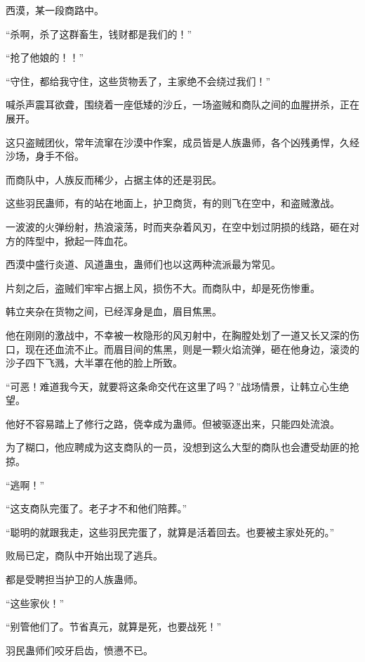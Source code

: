 
\begin{this_body}

西漠，某一段商路中。

“杀啊，杀了这群畜生，钱财都是我们的！”

“抢了他娘的！！”

“守住，都给我守住，这些货物丢了，主家绝不会绕过我们！”

喊杀声震耳欲聋，围绕着一座低矮的沙丘，一场盗贼和商队之间的血腥拼杀，正在展开。

这只盗贼团伙，常年流窜在沙漠中作案，成员皆是人族蛊师，各个凶残勇悍，久经沙场，身手不俗。

而商队中，人族反而稀少，占据主体的还是羽民。

这些羽民蛊师，有的站在地面上，护卫商货，有的则飞在空中，和盗贼激战。

一波波的火弹纷射，热浪滚荡，时而夹杂着风刃，在空中划过阴损的线路，砸在对方的阵型中，掀起一阵血花。

西漠中盛行炎道、风道蛊虫，蛊师们也以这两种流派最为常见。

片刻之后，盗贼们牢牢占据上风，损伤不大。而商队中，却是死伤惨重。

韩立夹杂在货物之间，已经浑身是血，眉目焦黑。

他在刚刚的激战中，不幸被一枚隐形的风刃射中，在胸膛处划了一道又长又深的伤口，现在还血流不止。而眉目间的焦黑，则是一颗火焰流弹，砸在他身边，滚烫的沙子四下飞溅，大半罩在他的脸上所致。

“可恶！难道我今天，就要将这条命交代在这里了吗？”战场情景，让韩立心生绝望。

他好不容易踏上了修行之路，侥幸成为蛊师。但被驱逐出来，只能四处流浪。

为了糊口，他应聘成为这支商队的一员，没想到这么大型的商队也会遭受劫匪的抢掠。

“逃啊！”

“这支商队完蛋了。老子才不和他们陪葬。”

“聪明的就跟我走，这些羽民完蛋了，就算是活着回去。也要被主家处死的。”

败局已定，商队中开始出现了逃兵。

都是受聘担当护卫的人族蛊师。

“这些家伙！”

“别管他们了。节省真元，就算是死，也要战死！”

羽民蛊师们咬牙启齿，愤懑不已。


\end{this_body}
